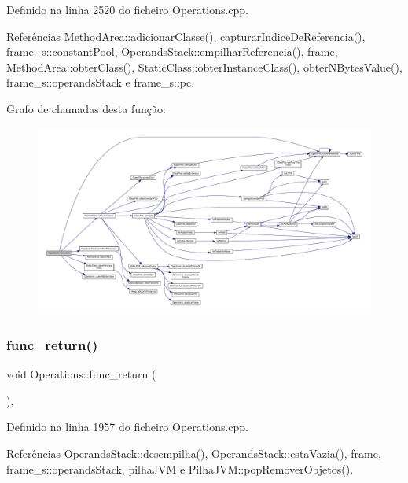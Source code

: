 Definido na linha 2520 do ficheiro Operations.\+cpp.



Referências Method\+Area\+::adicionar\+Classe(), capturar\+Indice\+De\+Referencia(), frame\+\_\+s\+::constant\+Pool, Operands\+Stack\+::empilhar\+Referencia(), frame, Method\+Area\+::obter\+Class(), Static\+Class\+::obter\+Instance\+Class(), obter\+N\+Bytes\+Value(), frame\+\_\+s\+::operands\+Stack e frame\+\_\+s\+::pc.

Grafo de chamadas desta função\+:
\nopagebreak
\begin{figure}[H]
\begin{center}
\leavevmode
\includegraphics[width=350pt]{classOperations_a7594e147407e1f4ede57229899fd17d6_cgraph}
\end{center}
\end{figure}
\mbox{\label{classOperations_aa33b77fb62f7e76c347503c97c6b080b}} 
\subsubsection{\texorpdfstring{func\+\_\+return()}{func\_return()}}
{\footnotesize\ttfamily void Operations\+::func\+\_\+return (\begin{DoxyParamCaption}{ }\end{DoxyParamCaption})\hspace{0.3cm}{\ttfamily [static]}, {\ttfamily [private]}}



Definido na linha 1957 do ficheiro Operations.\+cpp.



Referências Operands\+Stack\+::desempilha(), Operands\+Stack\+::esta\+Vazia(), frame, frame\+\_\+s\+::operands\+Stack, pilha\+J\+VM e Pilha\+J\+V\+M\+::pop\+Remover\+Objetos().

